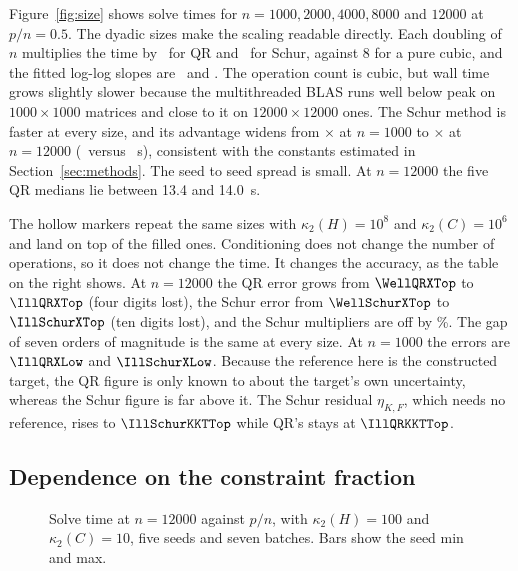 \documentclass[10pt]{article}
\newcommand{\kap}{\kappa_2}
\newcommand{\plotqr}[1]{%
  \addplot+[color=QRBlue,mark=*,mark size=1.7pt,line width=.9pt,
  error bars/y dir=both,error bars/y explicit,error bars/error bar style={line width=.5pt}]
  table[x=x,y=y,y error plus=plus,y error minus=minus,col sep=comma]{data/#1};}
\newcommand{\plotschur}[1]{%
  \addplot+[color=SchurOrange,mark=square*,mark size=1.6pt,line width=.9pt,
  error bars/y dir=both,error bars/y explicit,error bars/error bar style={line width=.5pt}]
  table[x=x,y=y,y error plus=plus,y error minus=minus,col sep=comma]{data/#1};}
\begin{document}
Figure~\ref{fig:size} shows solve times for $n=1000,2000,4000,8000$ and $12000$ at
$p/n=0.5$. The dyadic sizes make the scaling readable directly. Each doubling of $n$
multiplies the time by \DoublingQR\ for QR and \DoublingSchur\ for Schur, against 8 for a
pure cubic, and the fitted log-log slopes are \SlopeQR\ and \SlopeSchur. The operation
count is cubic, but wall time grows slightly slower because the multithreaded BLAS runs well
below peak on $1000\times1000$ matrices and close to it on $12000\times12000$ ones. The
Schur method is faster at every size, and its advantage widens from \SizeRatioLow$\times$
at $n=1000$ to \SizeRatioTop$\times$ at $n=12000$ (\SizeQRTop\ versus \SizeSchurTop~s), consistent
with the constants estimated in Section~\ref{sec:methods}. The seed to seed spread is
small. At $n=12000$ the five QR medians lie between 13.4 and 14.0~s.

The hollow markers repeat the same sizes with $\kap(H)=10^8$ and $\kap(C)=10^6$ and land on
top of the filled ones. Conditioning does not change the number of operations, so it
does not change the time. It changes the accuracy, as the table on the right shows. At
$n=12000$ the QR error grows from $\WellQRXTop$ to $\IllQRXTop$ (four digits lost), the
Schur error from $\WellSchurXTop$ to $\IllSchurXTop$ (ten digits lost), and the Schur
multipliers are off by \IllSchurLTop\%. The gap of seven orders of magnitude is the
same at every size. At $n=1000$ the errors are $\IllQRXLow$ and $\IllSchurXLow$. Because
the reference here is the constructed target, the QR figure is only known to about the
target's own uncertainty, whereas the Schur figure is far above it. The Schur residual
$\eta_{K,F}$, which needs no reference, rises to $\IllSchurKKTTop$ while QR's stays at
$\IllQRKKTTop$.

\subsection{Dependence on the constraint fraction}

\begin{figure}[t]
\centering
{}
\caption{Solve time at $n=12000$ against $p/n$, with $\kap(H)=100$ and $\kap(C)=10$, five
seeds and seven batches. Bars show the seed min and max.}
\label{fig:fraction}
\end{figure}
\end{document}
